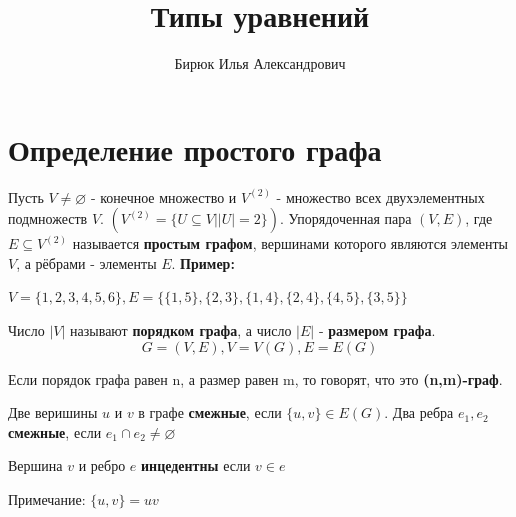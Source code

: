 \documentclass[a4paper, 12pt]{article}
\title{Типы уравнений}
\author{Бирюк Илья Александрович}
\theoremstyle{definition}
\theoremstyle{definition}
\begin{document}
  \maketitle
  \newpage
  \tableofcontents
  \newpage
  \section{Определение простого графа}
  Пусть $V\neq\varnothing$ - конечное множество и $V^{(2)}$ - множество
  всех двухэлементных подмножеств $V$. $(V^{(2)}=\{U\subseteq V||U|=2\})$.
  Упорядоченная пара $(V,E)$, где $E\subseteq V^{(2)}$ называется \textbf{простым графом}, вершинами которого являются элементы $V$, а рёбрами - элементы $E$.
  \textbf{Пример:}

    $V=\{1,2,3,4,5,6\}, E=\{\{1,5\},\{2,3\},\{1,4\},\{2,4\},\{4,5\},\{3,5\}\}$
    
    
    Число $|V|$ называют \textbf{порядком графа}, а число $|E|$ - \textbf{размером графа}.
    $$G=(V,E), V=V(G), E=E(G)$$

    Если порядок графа равен n, а размер равен m, то говорят, что это \textbf{(n,m)-граф}.

    Две веришины $u$ и $v$ в графе \textbf{смежные}, если $\{u,v\}\in E(G)$. Два ребра $e_1,e_2$ \textbf{смежные}, если $e_1\cap e_2\neq\varnothing$

    Вершина $v$ и ребро $e$ \textbf{инцедентны} если $v\in e$

    
    Примечание: $\{u,v\}=uv$
\end{document}
